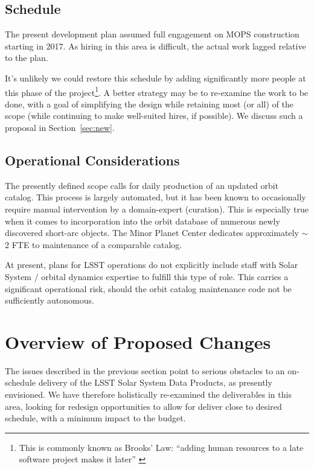 \documentclass[DM,authoryear,toc,lsstdraft]{lsstdoc}
\begin{document}
\subsection{Schedule\label{sec:schedule}}

The present development plan assumed full engagement on MOPS construction starting in 2017. As hiring in this area is difficult, the actual work lagged relative to the plan.

It's unlikely we could restore this schedule by adding significantly more people at this phase of the project\footnote{This is commonly known as Brooks' Law: ``adding human resources to a late software project makes it later'' \citep{1982mmme.book.....B}}. A better strategy may be to re-examine the work to be done, with a goal of simplifying the design while retaining most (or all) of the scope (while continuing to make well-suited hires, if possible). We discuss such a proposal in Section~\ref{sec:new}.

\subsection{Operational Considerations}

The presently defined scope calls for daily production of an updated orbit catalog. This process is largely automated, but it has been known to occasionally require manual intervention by a domain-expert (curation). This is especially true when it comes to incorporation into the orbit database of numerous newly discovered short-arc objects. The Minor Planet Center dedicates approximately $\sim$2 FTE to maintenance of a comparable catalog.

At present, plans for LSST operations do not explicitly include staff with Solar System / orbital dynamics expertise to fulfill this type of role. This carries a significant operational risk, should the orbit catalog maintenance code not be sufficiently autonomous.

\section{Overview of Proposed Changes\label{sec:new}}

The issues described in the previous section point to serious obstacles to an on-schedule delivery of the LSST Solar System Data Products, as presently envisioned. We have therefore holistically re-examined the deliverables in this area, looking for redesign opportunities to allow for deliver close to desired schedule, with a minimum impact to the budget.
\end{document}
